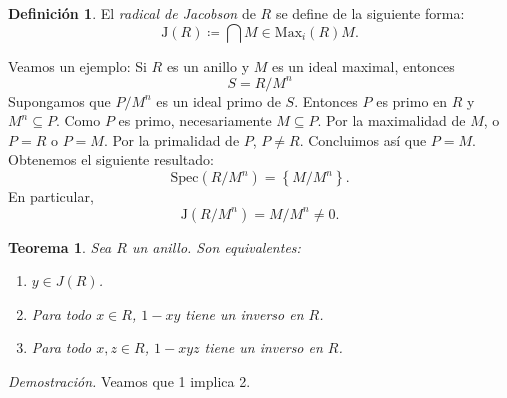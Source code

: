 \documentclass[11pt]{book}
\def\Spec{\mathrm{Spec}}
\def\Max{\mathrm{Max}}
\def\J{\mathrm{J}}
\newtheorem{theorem}{Teorema}[section]
\theoremstyle{definition}
\newtheorem{definition}{Definición}[section]
\begin{document}
\begin{definition}
    El \textit{radical de Jacobson} de $R$ se define de la siguiente forma:\[
    \J(R)\coloneq\bigcap{M\in\Max_i(R)}M.
    \]
\end{definition}
Veamos un ejemplo: Si $R$ es un anillo y $M$ es un ideal maximal, entonces\[
S=R/M^n
\]Supongamos que $P/M^n$ es un ideal primo de $S$. Entonces $P$ es primo en $R$ y $M^n\subseteq P$. Como $P$ es primo, necesariamente $M\subseteq P$. Por la maximalidad de $M$, o $P=R$ o $P=M$. Por la primalidad de $P$, $P\neq R$. Concluimos así que $P=M$. Obtenemos el siguiente resultado:\[
\Spec\left(R/M^n\right)=\left\{M/M^n\right\}.
\]En particular,\[
\J(R/M^n)=M/M^n\neq 0.
\]

\begin{theorem}
    Sea $R$ un anillo. Son equivalentes:\begin{enumerate}
        \item $y\in J(R)$.
        \item Para todo $x\in R$, $1-xy$ tiene un inverso en $R$.
        \item Para todo $x,z\in R$, $1-xyz$ tiene un inverso en $R$.
    \end{enumerate}
\end{theorem}
\noindent\textit{Demostración.} Veamos que 1 implica 2.
\end{document}
